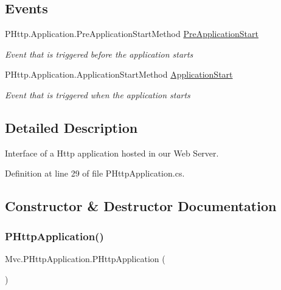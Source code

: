 \subsection*{Events}
\begin{DoxyCompactItemize}
\item 
P\+Http.\+Application.\+Pre\+Application\+Start\+Method \hyperlink{class_mvc_1_1_p_http_application_acb22952466023ec2a4a6442866f8fbe9}{Pre\+Application\+Start}
\begin{DoxyCompactList}\small\item\em Event that is triggered before the application starts \end{DoxyCompactList}\item 
P\+Http.\+Application.\+Application\+Start\+Method \hyperlink{class_mvc_1_1_p_http_application_a925464a1e616113cb0975ca67c49a591}{Application\+Start}
\begin{DoxyCompactList}\small\item\em Event that is triggered when the application starts \end{DoxyCompactList}\end{DoxyCompactItemize}


\subsection{Detailed Description}
Interface of a Http application hosted in our Web Server. 



Definition at line 29 of file P\+Http\+Application.\+cs.



\subsection{Constructor \& Destructor Documentation}
\mbox{\label{class_mvc_1_1_p_http_application_afea25215430e7e6346ba122a10693ed1}} 
\subsubsection{\texorpdfstring{P\+Http\+Application()}{PHttpApplication()}}
{\footnotesize\ttfamily Mvc.\+P\+Http\+Application.\+P\+Http\+Application (\begin{DoxyParamCaption}{ }\end{DoxyParamCaption})}




